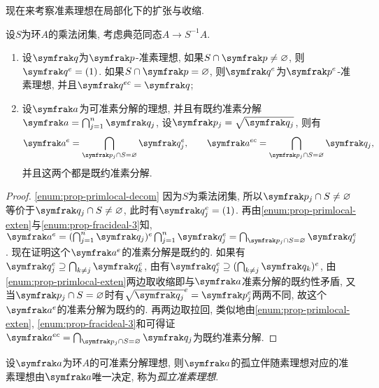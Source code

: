 现在来考察准素理想在局部化下的扩张与收缩.

\begin{proposition}\label{prop:primlocal}设$S$为环$A$的乘法闭集, 考虑典范同态$A\to S^{-1}A$.
  \begin{enumerate}
    \item\label{enum:prop-primlocal-exten} 设$\ideal{q}$为$\ideal{p}$-准素理想, 如果$S\cap\ideal{p}\neq\varnothing$, 则$\ideal{q}^e=(1)$. 如果$S\cap\ideal{p}=\varnothing$, 则$\ideal{q}^e$为$\ideal{p}^e$-准素理想, 并且$\ideal{q}^{ec}=\ideal{q}$;
    \item\label{enum:prop-primlocal-decom} 设$\ideal{a}$为可准素分解的理想, 并且有既约准素分解$\ideal{a}=\bigcap_{j=1}^n\ideal{q}_j$, 设$\ideal{p}_j=\sqrt{\ideal{q}_j}$, 则有
    \begin{equation*}
      \ideal{a}^{e}=\bigcap_{\ideal{p}_j\cap S=\varnothing}\ideal{q}_j^e,
      \qquad \ideal{a}^{ec}=\bigcap_{\ideal{p}_j\cap S=\varnothing}\ideal{q}_j,
    \end{equation*}
    并且这两个都是既约准素分解.
  \end{enumerate}
\end{proposition}

\begin{proof}
  \ref{enum:prop-primlocal-decom} 因为$S$为乘法闭集, 所以$\ideal{p}_j\cap S\neq\varnothing$等价于$\ideal{q}_j\cap S\neq\varnothing$, 此时有$\ideal{q}_j^e=(1)$. 再由\ref{enum:prop-primlocal-exten}与\ref{enum:prop-fracideal-3}知, $\ideal{a}^e=(\bigcap_{j=1}^n\ideal{q}_j)^e\bigcap_{j=1}^n\ideal{q}_j^e=\bigcap_{\ideal{p}_j\cap S=\varnothing}\ideal{q}_j^e$. 现在证明这个$\ideal{a}^e$的准素分解是既约的. 如果有$\ideal{q}_j^e\supseteq\bigcap_{k\neq j}\ideal{q}_k^e$, 由有$\ideal{q}_j^e\supseteq(\bigcap_{k\neq j}\ideal{q}_k)^e$, 由\ref{enum:prop-primlocal-exten}两边取收缩即与$\ideal{a}$准素分解的既约性矛盾, 又当$\ideal{p}_j\cap S=\varnothing$时有$\sqrt{\ideal{q}_j}^e=\ideal{p}_j^e$两两不同, 故这个$\ideal{a}^e$的准素分解为既约的. 再两边取拉回, 类似地由\ref{enum:prop-primlocal-exten}, \ref{enum:prop-fracideal-3}和可得证$\ideal{a}^{ec}=\bigcap_{\ideal{p}_j\cap S=\varnothing}\ideal{q}_j$为既约准素分解.
\end{proof}

\begin{theorem}
  设$\ideal{a}$为环$A$的可准素分解理想, 则$\ideal{a}$的孤立伴随素理想对应的准素理想由$\ideal{a}$唯一决定, 称为\emph{孤立准素理想}.
\end{theorem}

